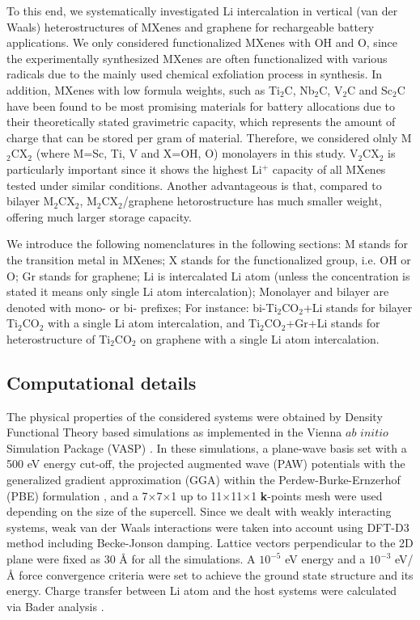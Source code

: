 To this end, we  systematically investigated Li intercalation in vertical (van der Waals) heterostructures of MXenes and graphene for rechargeable battery applications. We only considered functionalized MXenes with  OH and O, since the experimentally synthesized MXenes are often functionalized with various radicals due to the mainly used chemical exfoliation process in synthesis. In addition, MXenes with low formula weights, such as Ti$_2$C, Nb$_2$C, V$_2$C and Sc$_2$C have been found to be most promising\cite{doi:10.1021/ja405735d} materials for battery allocations due to their theoretically stated gravimetric capacity, which represents the amount of charge that can be stored per gram of material. Therefore, we considered olnly M$_2$CX$_2$ (where M=Sc, Ti, V and X=OH, O) monolayers in this study. V$_2$CX$_2$ is particularly important since it shows the highest Li$^+$ capacity of all MXenes tested under similar conditions\cite{doi:10.1021/ja508154e}. Another advantageous is that, compared to bilayer M$_2$CX$_2$, M$_2$CX$_2$/graphene hetorostructure has much smaller weight, offering much larger storage capacity. 

We introduce the following nomenclatures in the following sections: M stands for the transition metal in MXenes; X stands for the functionalized group, i.e. OH or O; Gr stands for graphene; Li is intercalated Li atom (unless the concentration is stated it means only single Li atom intercalation); Monolayer and bilayer are denoted with mono- or bi- prefixes; For instance: bi-Ti$_2$CO$_2$+Li stands for bilayer Ti$_2$CO$_2$ with a single Li atom intercalation, and Ti$_2$CO$_2$+Gr+Li stands for heterostructure of Ti$_2$CO$_2$ on graphene with a single Li atom intercalation. 

\subsection{Computational details\label{comp}}
The physical properties of the considered systems were obtained by Density Functional Theory based simulations as implemented in the Vienna $ab$ $initio$ Simulation Package (VASP) \cite{VASP1,VASP2,VASP3,VASP4}. In these simulations, a plane-wave basis set with a 500 eV energy cut-off, the projected augmented wave (PAW) potentials\cite{PAW1,PAW2} with the generalized gradient approximation (GGA) within the Perdew-Burke-Ernzerhof (PBE) formulation \cite{GGA-PBE1,GGA-PBE2}, and a 7$\times$7$\times$1 up to 11$\times$11$\times$1 \textbf{k}-points mesh were used depending on the size of the supercell. Since we dealt with weakly interacting systems, weak van der Waals interactions were taken into account using DFT-D3 method \citet{Grimme2011} including Becke-Jonson damping. Lattice vectors perpendicular to the 2D plane were fixed as 30 {\AA} for all the simulations. A $10^{-5}$ eV energy and a $10^{-3}$ eV/{\AA} force convergence criteria were set to achieve the ground state structure and its energy. Charge transfer between Li  atom and the host systems were calculated via Bader analysis \cite{Bader1,Bader2,Bader3,Bader4}. 

